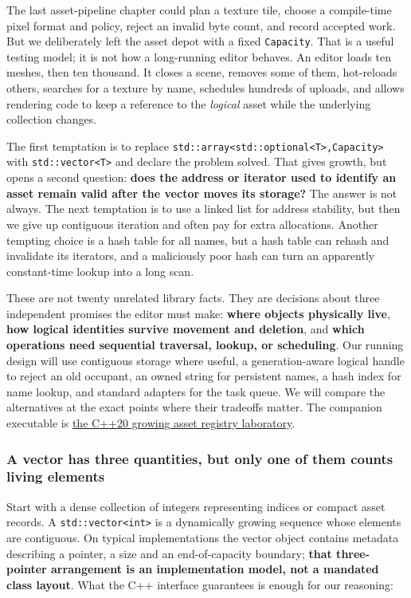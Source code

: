 The last asset-pipeline chapter could plan a texture tile, choose a compile-time pixel format and policy, reject an invalid byte count, and record accepted work. But we deliberately left the asset depot with a fixed \texttt{Capacity}. That is a useful testing model; it is not how a long-running editor behaves. An editor loads ten meshes, then ten thousand. It closes a scene, removes some of them, hot-reloads others, searches for a texture by name, schedules hundreds of uploads, and allows rendering code to keep a reference to the \emph{logical} asset while the underlying collection changes.

The first temptation is to replace \texttt{std::array\textless{}std::optional\textless{}T\textgreater{},Capacity\textgreater{}} with \texttt{std::vector\textless{}T\textgreater{}} and declare the problem solved. That gives growth, but opens a second question: \textbf{does the address or iterator used to identify an asset remain valid after the vector moves its storage?} The answer is not always. The next temptation is to use a linked list for address stability, but then we give up contiguous iteration and often pay for extra allocations. Another tempting choice is a hash table for all names, but a hash table can rehash and invalidate its iterators, and a maliciously poor hash can turn an apparently constant-time lookup into a long scan.

These are not twenty unrelated library facts. They are decisions about three independent promises the editor must make: \textbf{where objects physically live}, \textbf{how logical identities survive movement and deletion}, and \textbf{which operations need sequential traversal, lookup, or scheduling}. Our running design will use contiguous storage where useful, a generation-aware logical handle to reject an old occupant, an owned string for persistent names, a hash index for name lookup, and standard adapters for the task queue. We will compare the alternatives at the exact points where their tradeoffs matter. The companion executable is \href{tools/labs/asset_container_lab.cpp}{the C++20 growing asset registry laboratory}.

\subsubsection{A vector has three quantities, but only one of them counts living elements}\label{a-vector-has-three-quantities-but-only-one-of-them-counts-living-elements}

Start with a dense collection of integers representing indices or compact asset records. A \texttt{std::vector\textless{}int\textgreater{}} is a dynamically growing sequence whose elements are contiguous. On typical implementations the vector object contains metadata describing a pointer, a size and an end-of-capacity boundary; \textbf{that three-pointer arrangement is an implementation model, not a mandated class layout}. What the C++ interface guarantees is enough for our reasoning:


